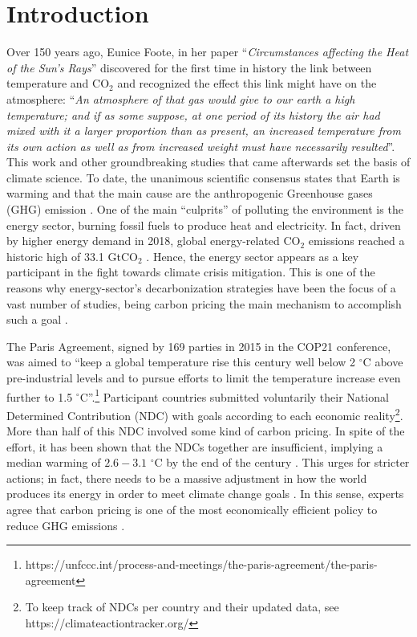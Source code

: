 \documentclass[11pt, letterpaper]{article}
\begin{document}
\section{Introduction}\label{sec:intro}
Over 150 years ago, Eunice Foote, in her paper ``\textit{Circumstances affecting the Heat of the Sun's Rays}'' \cite{Foote1856} discovered for the first time in history the link between temperature and CO$_2$ and recognized the effect this link might have on the atmosphere: ``\textit{An atmosphere of that gas would give to our earth a high temperature; and if as some suppose, at one period of its history the air had mixed with it a larger proportion than as present, an increased temperature from its own action as well as from increased weight must have necessarily resulted}''. This work and other groundbreaking studies that came afterwards set the basis of climate science. To date, the unanimous scientific consensus states that Earth is warming and that the main cause are the anthropogenic Greenhouse gases (GHG) emission \cite{powell2019scientists}. One of the main ``culprits'' of polluting the environment is the energy sector, burning fossil fuels to produce heat and electricity. In fact, driven by higher energy demand in 2018, global energy-related CO$_2$ emissions reached a historic high of 33.1 GtCO$_2$ \cite{IEA2019}. Hence, the energy sector appears as a key participant in the fight towards climate crisis mitigation. This is one of the reasons why energy-sector's decarbonization strategies have been the focus of a vast number of studies, being carbon pricing the main mechanism to accomplish such a goal \cite{Robert2019Carbon}. 

\smallskip
The Paris Agreement, signed by 169 parties in 2015 in the COP21 conference, was aimed to ``keep a global temperature rise this century well below 2 $^{\circ}$C above pre-industrial levels and to pursue efforts to limit the temperature increase even further to 1.5 $^{\circ}$C''.\footnote{ https://unfccc.int/process-and-meetings/the-paris-agreement/the-paris-agreement} Participant countries submitted voluntarily their National Determined Contribution (NDC) with goals according to each economic reality\footnote{ To keep track of NDCs per country and their updated data, see https://climateactiontracker.org/ }. More than half of this NDC involved some kind of carbon pricing. In spite of the effort, it has been shown that the NDCs together are insufficient, implying a median warming of $2.6-3.1$ $^{\circ}$C by the end of the century \cite{rogelj2016paris}. This urges for stricter actions; in fact, there needs to be a massive adjustment in how the world produces its energy in order to meet climate change goals \cite{UNreport}. In this sense, experts agree that carbon pricing is one of the most economically efficient policy to reduce GHG emissions \cite{schmalensee2015lessons}.
\end{document}
